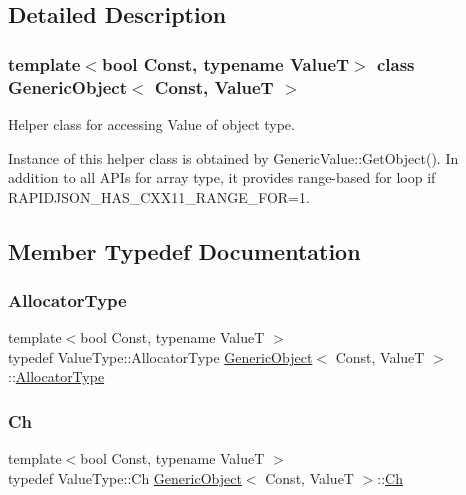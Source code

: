 \subsection{Detailed Description}
\subsubsection*{template$<$bool Const, typename ValueT$>$\newline
class Generic\+Object$<$ Const, Value\+T $>$}

Helper class for accessing Value of object type. 

Instance of this helper class is obtained by {\ttfamily Generic\+Value\+::\+Get\+Object()}. In addition to all A\+P\+Is for array type, it provides range-\/based for loop if {\ttfamily R\+A\+P\+I\+D\+J\+S\+O\+N\+\_\+\+H\+A\+S\+\_\+\+C\+X\+X11\+\_\+\+R\+A\+N\+G\+E\+\_\+\+F\+OR=1}. 

\subsection{Member Typedef Documentation}
\mbox{\label{classGenericObject_a00c8cee952d5ebadc5e1c309aa489ad9}} 
\subsubsection{\texorpdfstring{Allocator\+Type}{AllocatorType}}
{\footnotesize\ttfamily template$<$bool Const, typename ValueT $>$ \\
typedef Value\+Type\+::\+Allocator\+Type \hyperlink{classGenericObject}{Generic\+Object}$<$ Const, ValueT $>$\+::\hyperlink{classGenericObject_a00c8cee952d5ebadc5e1c309aa489ad9}{Allocator\+Type}}

\mbox{\label{classGenericObject_ac6747e5baa13e15bcea1658b5624647a}} 
\subsubsection{\texorpdfstring{Ch}{Ch}}
{\footnotesize\ttfamily template$<$bool Const, typename ValueT $>$ \\
typedef Value\+Type\+::\+Ch \hyperlink{classGenericObject}{Generic\+Object}$<$ Const, ValueT $>$\+::\hyperlink{classGenericObject_ac6747e5baa13e15bcea1658b5624647a}{Ch}}

